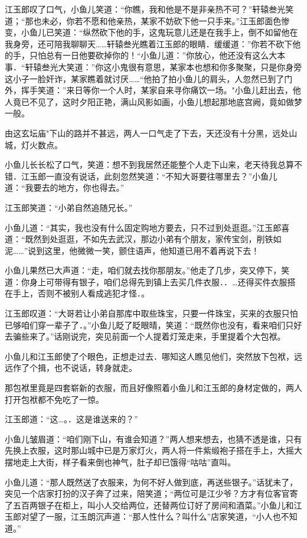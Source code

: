 \documentclass[12pt,oneside]{book}
\begin{document}
江玉郎叹了口气，小鱼儿笑道：``你瞧，我和他是不是非亲热不可？''轩辕叁光笑道；``那也未必，你若不愿和他亲热，某家不妨砍下他一只手来。''江玉郎面色惨变，小鱼儿已笑道：``纵然砍下他的手，这鬼玩意儿还是在我手上，倒不如留他在我身旁，还可陪我聊聊天\ldots\ldots 轩辕叁光瞧着江玉郎的眼睛．缓缓道：''你若不砍下他的手，只怕总有一日他要砍掉你的！``小鱼儿道：''你放心，他还没有这么大本事．``轩辕叁光大笑道：''你这小鬼很有意思，某家本也想和你多聚聚，只是你身旁这小子一脸奸诈，某家瞧着就讨厌\ldots\ldots{}``他拍了拍小鱼儿的肩头，人忽然已到了门外，挥手笑道：''来日等你一个人时，某家自来寻你痛饮一场。"小鱼儿赶出去，他人竟已不见了，这时夕阳正艳，满山风影如画，小鱼儿想起那地底宫阙，竟如做梦一般。

由这玄坛庙"下山的路并不甚远，两人一口气走了下去，天还没有十分黑，远处山城，灯火数点。

小鱼儿长长松了口气，笑道：想不到我居然还能整个人走下山来，老天待我总算不错．江玉郎一直没有说话，此刻忽然笑道：``不知大哥要往哪里去？''小鱼儿道：``我要去的地方，你也得去。''

江玉郎笑道：``小弟自然追随兄长。''

小鱼儿道：``其实，我也没有什么固定购地方要去，只不过到处逛逛。''江玉郎喜道：``既然到处逛逛，不如先去武汉，那边小弟有个朋友，家传宝剑，削铁如泥\ldots\ldots{}''说到这里，他微微一笑，颤住语声，他知道已用不着再说下去！

小鱼儿果然已大声道：``走，咱们就去找你那朋友。''他走了几步，突又停下，笑道：你身上可带得有银子，咱们总得先到镇上去买几件衣服．．\ldots 还得买件衣服搭在手上，否则不被别人看成逃犯才怪．。

江玉郎叹道：``大哥若让小弟自那库中取些珠宝，只要一件珠宝，买来的衣服只怕已够咱们穿一辈子了．。''小鱼儿眨了眨眼晴，笑道：``既然你也没有，看来咱们只好去骗些来了。''话刚说完，突见前面一个人提着灯笼走来，手里提着个大包袱。

小鱼儿和江玉郎使了个眼色，正想走过去．哪知这人瞧见他们，突然放下包袱，远远作了个揖，也不说话，转身就走。

那包袱里竟是四套崭新的衣服，而且好像照着小鱼儿和江玉郎的身材定做的，两人打开包袱都不免吃了一惊。

江玉郎道：``这\ldots。．这是谁送来的？''

小鱼儿皱眉道：``咱们刚下山，有谁会知道？''两人想来想去，也猜不透是谁，只有先换上衣服，这时那山城中已是万家灯火，两人将一件紫缎袍子搭在手上，大摇大摆地走上大街，样子看来倒也神气，肚子却已饿得``咕咕''直叫。

小鱼儿道：``那人既然送了衣服来，为何不好人做到底，再送些银子。''话犹未了，突见一个店家打扮的汉子奔了过来，陪笑道；``两位可是江少爷？方才有位客官寄了五百两银子在柜上，叫小人交给两位，还替两位订好了房间和酒菜。''小鱼儿和江玉郎对望了一服，江玉朗沉声道：``那人性什么？叫什么''店家笑道，``小人也不知道。''
\end{document}
